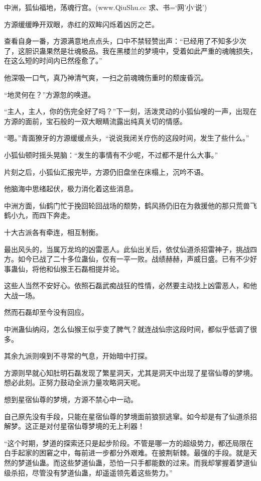 
\begin{this_body}

中洲，狐仙福地，荡魂行宫。(www.QiuShu.cc 求、书=‘网’小‘说’)

方源缓缓睁开双眼，赤红的双眸闪烁着凶厉之芒。

查看自身一番，方源满意地点点头，口中不禁轻赞出声：“已经用了不知多少次了，这胆识蛊果然是壮魂极品。我在黑楼兰的梦境中，受着如此严重的魂魄损失，在这么短的时间内已然痊愈了。”

他深吸一口气，真乃神清气爽，一扫之前魂魄伤重时的颓废昏沉。

“地灵何在？”方源忽的唤道。

“主人，主人，你的伤完全好了吗？”下一刻，活泼灵动的小狐仙嗖的一声，出现在方源的面前，宝石般的一双大眼睛流露出纯真关切的情感。

“嗯。”青面獠牙的方源缓缓点头，“说说我闭关疗伤的这段时间，发生了些什么。”

小狐仙顿时摇头晃脑：“发生的事情有不少呢，不过都不是什么大事。”

片刻之后，小狐仙汇报完毕，方源仍旧盘坐在床榻上，沉吟不语。

他脑海中思绪起伏，极力消化着这些消息。

中洲方面，仙鹤门忙于挽回轮回战场的颓势，鹤风扬仍旧在为救援他的那只荒兽飞鹤小九，而四下奔走。

十大古派各有牵连，相互制衡。

最出风头的，当属万龙坞的凶雷恶人。此仙出关后，依仗仙道杀招雷神子，挑战四方。如今已战了二十多位蛊仙，仅有一平一败。战绩赫赫，声威日盛。已有不少好事蛊仙，将他和仙猴王石磊相提并论。

这些人当然不安好心。依照石磊武痴战狂的性情，必然要主动找上凶雷恶人，和他大战一场。

然而石磊却至今没有回应。

中洲蛊仙纳闷，怎么仙猴王似乎变了脾气？就连战仙宗这段时间，都似乎低调了很多。

其余九派则嗅到不寻常的气息，开始暗中打探。

方源则早就心知肚明石磊发现了繁星洞天，尤其是洞天中出现了星宿仙尊的梦境。想必此刻。正努力鼓动全派力量攻略洞天呢。

想到星宿仙尊的梦境，方源不禁心中一动。

自己原先没有手段，只能在星宿仙尊的梦境面前狼狈逃窜。如今却是有了仙道杀招解梦。这正是对付星宿仙尊梦境的无上利器！

“这个时期，梦道的探索还只是起步阶段。不管是哪一方的超级势力，都还局限在白手起家的困窘之中，每前进一步都分外艰难。在披荆斩棘。最强的手段。就是天然的梦道仙蛊。而这些梦道仙蛊，恐怕一只手都能数的过来。而我却掌握着梦道仙级杀招，尽管没有梦道仙蛊，却遥遥领先着这些势力。”


\end{this_body}
